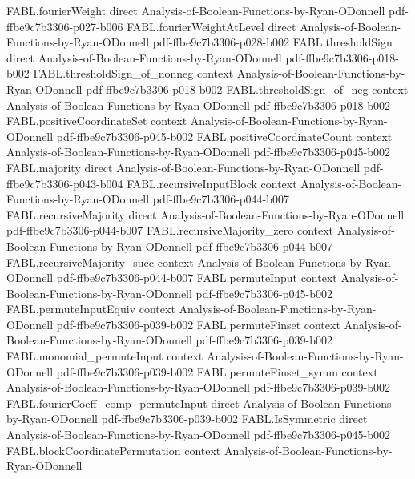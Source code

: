 \begin{theorem}
\proofstep
  {FABL.fourierWeight}
  {direct}
  {Analysis-of-Boolean-Functions-by-Ryan-ODonnell}
  {pdf-ffbe9c7b3306-p027-b006}
\proofstep
  {FABL.fourierWeightAtLevel}
  {direct}
  {Analysis-of-Boolean-Functions-by-Ryan-ODonnell}
  {pdf-ffbe9c7b3306-p028-b002}
\proofstep
  {FABL.thresholdSign}
  {direct}
  {Analysis-of-Boolean-Functions-by-Ryan-ODonnell}
  {pdf-ffbe9c7b3306-p018-b002}
\proofstep
  {FABL.thresholdSign_of_nonneg}
  {context}
  {Analysis-of-Boolean-Functions-by-Ryan-ODonnell}
  {pdf-ffbe9c7b3306-p018-b002}
\proofstep
  {FABL.thresholdSign_of_neg}
  {context}
  {Analysis-of-Boolean-Functions-by-Ryan-ODonnell}
  {pdf-ffbe9c7b3306-p018-b002}
\proofstep
  {FABL.positiveCoordinateSet}
  {context}
  {Analysis-of-Boolean-Functions-by-Ryan-ODonnell}
  {pdf-ffbe9c7b3306-p045-b002}
\proofstep
  {FABL.positiveCoordinateCount}
  {context}
  {Analysis-of-Boolean-Functions-by-Ryan-ODonnell}
  {pdf-ffbe9c7b3306-p045-b002}
\proofstep
  {FABL.majority}
  {direct}
  {Analysis-of-Boolean-Functions-by-Ryan-ODonnell}
  {pdf-ffbe9c7b3306-p043-b004}
\proofstep
  {FABL.recursiveInputBlock}
  {context}
  {Analysis-of-Boolean-Functions-by-Ryan-ODonnell}
  {pdf-ffbe9c7b3306-p044-b007}
\proofstep
  {FABL.recursiveMajority}
  {direct}
  {Analysis-of-Boolean-Functions-by-Ryan-ODonnell}
  {pdf-ffbe9c7b3306-p044-b007}
\proofstep
  {FABL.recursiveMajority_zero}
  {context}
  {Analysis-of-Boolean-Functions-by-Ryan-ODonnell}
  {pdf-ffbe9c7b3306-p044-b007}
\proofstep
  {FABL.recursiveMajority_succ}
  {context}
  {Analysis-of-Boolean-Functions-by-Ryan-ODonnell}
  {pdf-ffbe9c7b3306-p044-b007}
\proofstep
  {FABL.permuteInput}
  {context}
  {Analysis-of-Boolean-Functions-by-Ryan-ODonnell}
  {pdf-ffbe9c7b3306-p045-b002}
\proofstep
  {FABL.permuteInputEquiv}
  {context}
  {Analysis-of-Boolean-Functions-by-Ryan-ODonnell}
  {pdf-ffbe9c7b3306-p039-b002}
\proofstep
  {FABL.permuteFinset}
  {context}
  {Analysis-of-Boolean-Functions-by-Ryan-ODonnell}
  {pdf-ffbe9c7b3306-p039-b002}
\proofstep
  {FABL.monomial_permuteInput}
  {context}
  {Analysis-of-Boolean-Functions-by-Ryan-ODonnell}
  {pdf-ffbe9c7b3306-p039-b002}
\proofstep
  {FABL.permuteFinset_symm}
  {context}
  {Analysis-of-Boolean-Functions-by-Ryan-ODonnell}
  {pdf-ffbe9c7b3306-p039-b002}
\proofstep
  {FABL.fourierCoeff_comp_permuteInput}
  {direct}
  {Analysis-of-Boolean-Functions-by-Ryan-ODonnell}
  {pdf-ffbe9c7b3306-p039-b002}
\proofstep
  {FABL.IsSymmetric}
  {direct}
  {Analysis-of-Boolean-Functions-by-Ryan-ODonnell}
  {pdf-ffbe9c7b3306-p045-b002}
\proofstep
  {FABL.blockCoordinatePermutation}
  {context}
  {Analysis-of-Boolean-Functions-by-Ryan-ODonnell}

\end{theorem}
